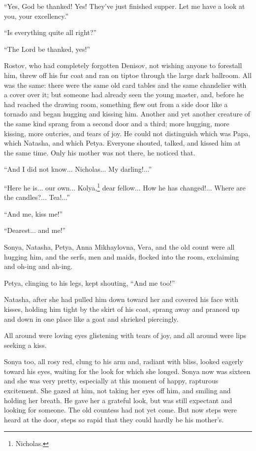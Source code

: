 ``Yes, God be thanked! Yes! They've just finished supper. Let me
have a look at you, your excellency.''

``Is everything quite all right?''

``The Lord be thanked, yes!''

Rostov, who had completely forgotten Denisov, not wishing anyone
to forestall him, threw off his fur coat and ran on tiptoe
through the large dark ballroom. All was the same: there were the
same old card tables and the same chandelier with a cover over
it; but someone had already seen the young master, and, before he
had reached the drawing room, something flew out from a side door
like a tornado and began hugging and kissing him. Another and yet
another creature of the same kind sprang from a second door and a
third; more hugging, more kissing, more outcries, and tears of
joy. He could not distinguish which was Papa, which Natasha, and
which Petya. Everyone shouted, talked, and kissed him at the same
time. Only his mother was not there, he noticed that.

``And I did not know... Nicholas... My darling!...''

``Here he is... our own... Kolya,\footnote{Nicholas.} dear
fellow... How he has changed!...  Where are the
candles?... Tea!...''

``And me, kiss me!''

``Dearest... and me!''

Sonya, Natasha, Petya, Anna Mikhaylovna, Vera, and the old count
were all hugging him, and the serfs, men and maids, flocked into
the room, exclaiming and oh-ing and ah-ing.

Petya, clinging to his legs, kept shouting, ``And me too!''

Natasha, after she had pulled him down toward her and covered his
face with kisses, holding him tight by the skirt of his coat,
sprang away and pranced up and down in one place like a goat and
shrieked piercingly.

All around were loving eyes glistening with tears of joy, and all
around were lips seeking a kiss.

Sonya too, all rosy red, clung to his arm and, radiant with
bliss, looked eagerly toward his eyes, waiting for the look for
which she longed. Sonya now was sixteen and she was very pretty,
especially at this moment of happy, rapturous excitement. She
gazed at him, not taking her eyes off him, and smiling and
holding her breath. He gave her a grateful look, but was still
expectant and looking for someone. The old countess had not yet
come. But now steps were heard at the door, steps so rapid that
they could hardly be his mother's.

